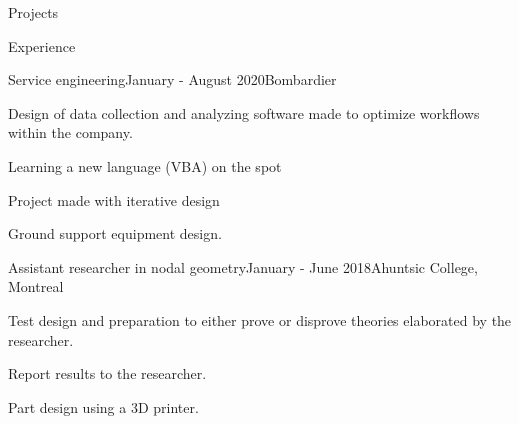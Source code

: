 \documentclass{resume} %
\begin{document}
\begin{rSection}{Projects}
	\end{rSection}
	
	
	
	\begin{rSection}{Experience}
		
		\begin{rSubsection}{Service engineering}{January - August 2020}{Bombardier}{}{}
			\item Design of data collection and analyzing software made to optimize workflows within the company.
			\item Learning a new language (VBA) on the spot
			\item Project made with iterative design
			\item Ground support equipment design.
		\end{rSubsection}
		
		\begin{rSubsection}{Assistant researcher in nodal geometry}{January - June 2018}{Ahuntsic College, Montreal}{}
			\item   Test design and preparation to either prove or disprove theories elaborated by the researcher.
			\item   Report results to the researcher.
			\item   Part design using a 3D printer.
		\end{rSubsection}
		
		
	\end{rSection}
	
\end{document}

